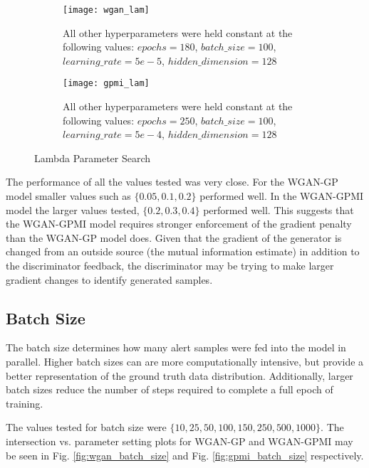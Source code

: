 \begin{figure}[!htbp]
	\centering

	\begin{subfigure}{.7\textwidth}
		\texttt{[image: wgan\_lam]}
	\end{subfigure}%
	\begin{subfigure}{.3\textwidth}
		\caption{
			All other hyperparameters were held constant at the following values: $epochs=180$, $batch\_size = 100$, $learning\_rate=5e-5$, $hidden\_dimension=128$
		}
		\label{fig:wgan_lam}
	\end{subfigure}%

	\begin{subfigure}{.7\textwidth}
		\texttt{[image: gpmi\_lam]}
	\end{subfigure}%
	\begin{subfigure}{.3\textwidth}
		\caption{
			All other hyperparameters were held constant at the following values: $epochs=250$, $batch\_size=100$, $learning\_rate=5e-4$, $hidden\_dimension=128$
		}
		\label{fig:gpmi_lam}
	\end{subfigure}%
	\caption{Lambda Parameter Search}
\end{figure}

The performance of all the values tested was very close. For the WGAN-GP model smaller values such as $\{0.05, 0.1, 0.2\}$ performed well. In the WGAN-GPMI model the larger values tested, $\{0.2,0.3,0.4\}$ performed well. This suggests that the WGAN-GPMI model requires stronger enforcement of the gradient penalty than the WGAN-GP model does. Given that the gradient of the generator is changed from an outside source (the mutual information estimate) in addition to the discriminator feedback, the discriminator may be trying to make larger gradient changes to identify generated samples.


\subsection{Batch Size}
\label{sec:bs}

The batch size determines how many alert samples were fed into the model in parallel. Higher batch sizes can are more computationally intensive, but provide a better representation of the ground truth data distribution. Additionally, larger batch sizes reduce the number of steps required to complete a full epoch of training.

The values tested for batch size were $\{10, 25, 50, 100, 150, 250, 500, 1000\}$. The intersection vs. parameter setting plots for WGAN-GP and WGAN-GPMI may be seen in Fig. \ref{fig:wgan_batch_size} and Fig. \ref{fig:gpmi_batch_size} respectively.

